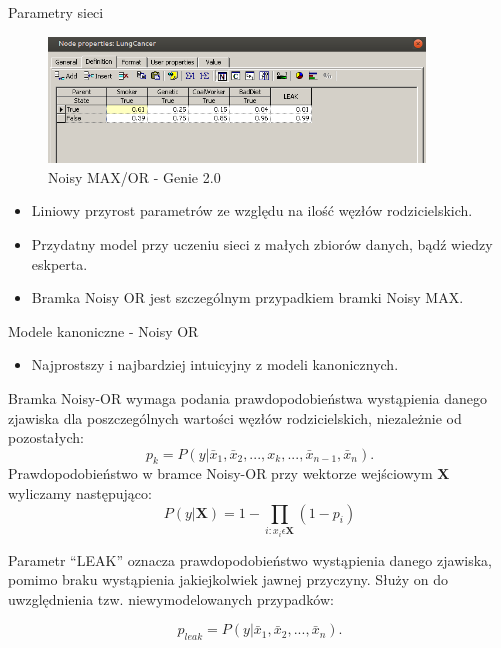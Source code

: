 \documentclass{beamer}
\begin{document}
\begin{frame}{Parametry sieci}
	\begin{figure}[h!]
		\centering
		\includegraphics[width=10cm]{3.png}
		\caption{Noisy MAX/OR - Genie 2.0}
	\end{figure}

	\begin{itemize}
		\item Liniowy przyrost parametrów ze względu na ilość węzłów rodzicielskich.
		\item Przydatny model przy uczeniu sieci z małych zbiorów danych, bądź wiedzy eskperta.
		\item Bramka Noisy OR jest szczególnym przypadkiem bramki Noisy MAX.
	\end{itemize}
\end{frame}

\begin{frame}{Modele kanoniczne - Noisy OR}
	\begin{itemize}
		\item Najprostszy i najbardziej intuicyjny z modeli kanonicznych.
	\end{itemize}
	Bramka Noisy-OR wymaga podania prawdopodobieństwa wystąpienia danego zjawiska dla poszczególnych wartości węzłów rodzicielskich, niezależnie od pozostałych:
	\begin{equation}
		p_k = P(y|\bar{x}_1, \bar{x}_2, ... , x_k, ... , \bar{x}_{n-1}, \bar{x}_n).
	\end{equation}
	Prawdopodobieństwo w bramce Noisy-OR przy wektorze wejściowym $\textbf{X}$ wyliczamy następująco:
	\begin{equation}
		P(y|\textbf{X}) = 1 - \prod_{i:x_i\epsilon \textbf{X}}(1-p_i)
	\end{equation}

	Parametr ``LEAK'' oznacza prawdopodobieństwo wystąpienia danego zjawiska, pomimo braku wystąpienia jakiejkolwiek jawnej przyczyny. 
	Służy on do uwzględnienia tzw. niewymodelowanych przypadków:

	\begin{equation}
		p_{leak} = P(y|\bar{x}_1, \bar{x}_2, ... , \bar{x}_n).
	\end{equation}
\end{frame}
\end{document}
